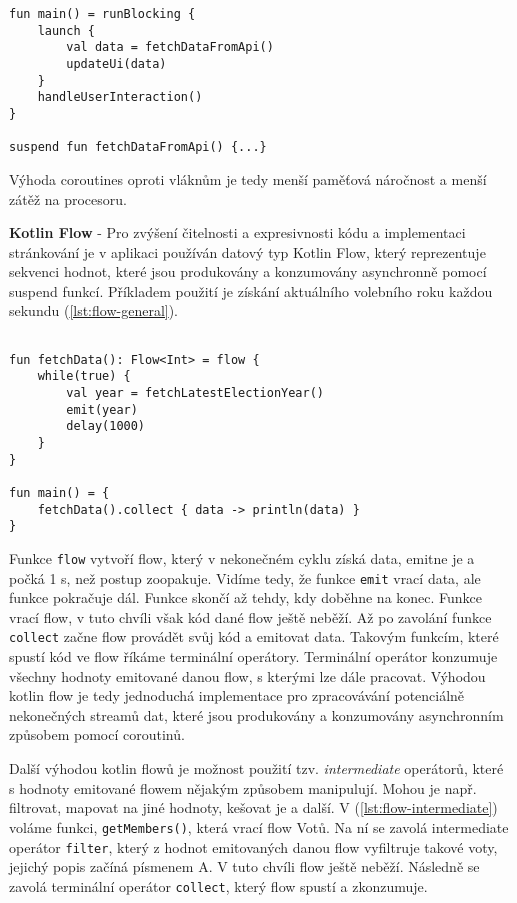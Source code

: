 \begin{lstlisting}[caption={Praktický příklad použití coroutiny}, label={lst:coroutine-practical}, tabsize=2]
fun main() = runBlocking {
	launch {
		val data = fetchDataFromApi()
		updateUi(data)
	}
	handleUserInteraction()
}

suspend fun fetchDataFromApi() {...}
\end{lstlisting}

\noindent Výhoda coroutines oproti vláknům je tedy menší paměťová náročnost a menší zátěž na procesoru.

\vspace*{10px}

\noindent \textbf{Kotlin Flow} - Pro zvýšení čitelnosti a expresivnosti kódu a implementaci stránkování je v aplikaci používán datový typ Kotlin Flow, který reprezentuje sekvenci hodnot, které jsou produkovány a konzumovány asynchronně pomocí suspend funkcí. Příkladem použití je získání aktuálního volebního roku každou sekundu (\ref{lst:flow-general}).

\begin{lstlisting}[caption={Příklad použití flow}, label={lst:flow-general}, tabsize=2]
              
fun fetchData(): Flow<Int> = flow {
	while(true) {
		val year = fetchLatestElectionYear()
		emit(year)
		delay(1000)
	}
}

fun main() = {
	fetchData().collect { data -> println(data) } 
}
\end{lstlisting}

\noindent Funkce \lstinline|flow| vytvoří flow, který v nekonečném cyklu získá data, emitne je a počká 1 s, než postup zoopakuje. Vidíme tedy, že funkce \lstinline|emit| vrací data, ale funkce pokračuje dál. Funkce skončí až tehdy, kdy doběhne na konec. Funkce vrací flow, v tuto chvíli však kód dané flow ještě neběží. Až po zavolání funkce \lstinline|collect| začne flow provádět svůj kód a emitovat data. Takovým funkcím, které spustí kód ve flow říkáme terminální operátory. Terminální operátor konzumuje všechny hodnoty emitované danou flow, s kterými lze dále pracovat. Výhodou kotlin flow je tedy jednoduchá implementace pro zpracovávání potenciálně nekonečných streamů dat, které jsou produkovány a konzumovány asynchronním způsobem pomocí coroutinů.

Další výhodou kotlin flowů je možnost použití tzv. \textit{intermediate} operátorů, které s hodnoty emitované flowem nějakým způsobem manipulují. Mohou je např. filtrovat, mapovat na jiné hodnoty, kešovat je a další. V (\ref{lst:flow-intermediate}) voláme funkci, \lstinline|getMembers()|, která vrací flow Votů. Na ní se zavolá intermediate operátor \lstinline|filter|, který z hodnot emitovaných danou flow vyfiltruje takové voty, jejichý popis začíná písmenem A. V tuto chvíli flow ještě neběží. Následně se zavolá terminální operátor \lstinline|collect|, který flow spustí a zkonzumuje.

